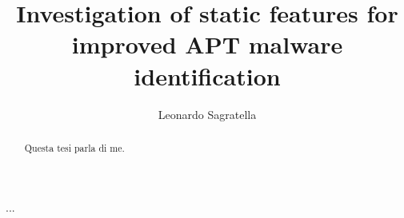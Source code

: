 \documentclass[binding=0.6cm,LaM,oneside]{sapthesis} %
\title{Investigation of static features for improved APT malware identification}
\author{Leonardo Sagratella}
\begin{document}
	\frontmatter
	\maketitle
	\dedication{Dedicato a\\ me stesso una stelle nascente e molto simpatica\\
	 ma soprattutto alla mia stella e luce, FEDERICO DI MAIO, figlio di GIGGINO DI MAIO nostro ex-premier nonchè padre fondatore del reddito di cittadinanza}
	\begin{abstract}
		Questa tesi parla di me.
	\end{abstract}
	\tableofcontents
	\mainmatter
	
	
	
	
	
	
	
	
	...
	\backmatter
	\cleardoublepage
	
	

	
	
\end{document}
